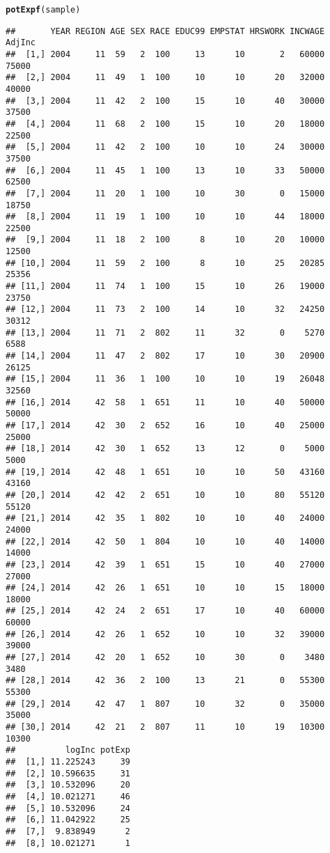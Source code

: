 \documentclass{article}\usepackage[]{graphicx}\usepackage[]{color}
\makeatletter
\newcommand{\hlstd}[1]{\textcolor[rgb]{0.345,0.345,0.345}{#1}}%
\newcommand{\hlkwd}[1]{\textcolor[rgb]{0.737,0.353,0.396}{\textbf{#1}}}%
\newenvironment{kframe}{%
 \def\at@end@of@kframe{}%
 \ifinner\ifhmode%
  \def\at@end@of@kframe{\end{minipage}}%
  \begin{minipage}{\columnwidth}%
 \fi\fi%
 \def\FrameCommand##1{\hskip\@totalleftmargin \hskip-\fboxsep
 \colorbox{shadecolor}{##1}\hskip-\fboxsep
     \hskip-\linewidth \hskip-\@totalleftmargin \hskip\columnwidth}%
 \MakeFramed {\advance\hsize-\width
   \@totalleftmargin\z@ \linewidth\hsize
   \@setminipage}}%
 {\par\unskip\endMakeFramed%
 \at@end@of@kframe}
\newenvironment{knitrout}{}{} %
\makeatother
\begin{document}
\begin{knitrout}
\begin{kframe}
\begin{alltt}
\hlkwd{potExpf}\hlstd{(sample)}
\end{alltt}
\begin{verbatim}
##       YEAR REGION AGE SEX RACE EDUC99 EMPSTAT HRSWORK INCWAGE AdjInc
##  [1,] 2004     11  59   2  100     13      10       2   60000  75000
##  [2,] 2004     11  49   1  100     10      10      20   32000  40000
##  [3,] 2004     11  42   2  100     15      10      40   30000  37500
##  [4,] 2004     11  68   2  100     15      10      20   18000  22500
##  [5,] 2004     11  42   2  100     10      10      24   30000  37500
##  [6,] 2004     11  45   1  100     13      10      33   50000  62500
##  [7,] 2004     11  20   1  100     10      30       0   15000  18750
##  [8,] 2004     11  19   1  100     10      10      44   18000  22500
##  [9,] 2004     11  18   2  100      8      10      20   10000  12500
## [10,] 2004     11  59   2  100      8      10      25   20285  25356
## [11,] 2004     11  74   1  100     15      10      26   19000  23750
## [12,] 2004     11  73   2  100     14      10      32   24250  30312
## [13,] 2004     11  71   2  802     11      32       0    5270   6588
## [14,] 2004     11  47   2  802     17      10      30   20900  26125
## [15,] 2004     11  36   1  100     10      10      19   26048  32560
## [16,] 2014     42  58   1  651     11      10      40   50000  50000
## [17,] 2014     42  30   2  652     16      10      40   25000  25000
## [18,] 2014     42  30   1  652     13      12       0    5000   5000
## [19,] 2014     42  48   1  651     10      10      50   43160  43160
## [20,] 2014     42  42   2  651     10      10      80   55120  55120
## [21,] 2014     42  35   1  802     10      10      40   24000  24000
## [22,] 2014     42  50   1  804     10      10      40   14000  14000
## [23,] 2014     42  39   1  651     15      10      40   27000  27000
## [24,] 2014     42  26   1  651     10      10      15   18000  18000
## [25,] 2014     42  24   2  651     17      10      40   60000  60000
## [26,] 2014     42  26   1  652     10      10      32   39000  39000
## [27,] 2014     42  20   1  652     10      30       0    3480   3480
## [28,] 2014     42  36   2  100     13      21       0   55300  55300
## [29,] 2014     42  47   1  807     10      32       0   35000  35000
## [30,] 2014     42  21   2  807     11      10      19   10300  10300
##          logInc potExp
##  [1,] 11.225243     39
##  [2,] 10.596635     31
##  [3,] 10.532096     20
##  [4,] 10.021271     46
##  [5,] 10.532096     24
##  [6,] 11.042922     25
##  [7,]  9.838949      2
##  [8,] 10.021271      1

\end{verbatim}
\end{kframe}
\end{knitrout}
\end{document}
